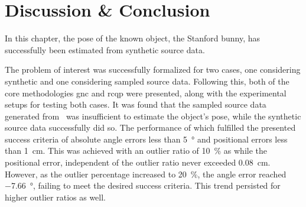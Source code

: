 \section{Discussion \& Conclusion}\label{sec:2-pose-estimation-discussion}


In this chapter, the pose of the known object, the Stanford bunny, has successfully been estimated from synthetic source data. \medskip


The problem of interest was successfully formalized for two cases, one considering synthetic and one considering sampled source data. Following this, both of the core methodologies \gls{gnc} and \gls{rcqp} were presented, along with the experimental setups for testing both cases. It was found that the sampled source data generated from~ was insufficient to estimate the object's pose, while the synthetic source data successfully did so. The performance of which fulfilled the presented success criteria of absolute angle errors less than \SI{5}{\degree} and positional errors less than \SI{1}{cm}. This was achieved with an outlier ratio of \SI{10}{\percent} as  while the positional error, independent of the outlier ratio never exceeded \SI{0.08}{\centi\meter}. However, as the outlier percentage increased to \SI{20}{\percent}, the angle error reached \SI{-7.66}{\degree}, failing to meet the desired success criteria. This trend persisted for higher outlier ratios as well. \medskip

